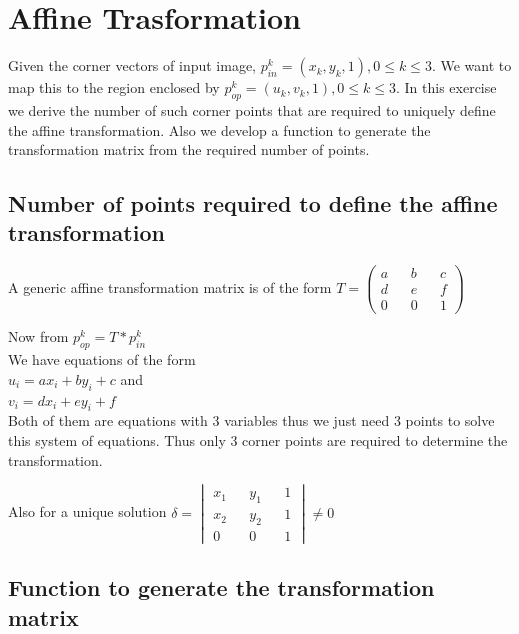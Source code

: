 \documentclass[paper=a4, fontsize=11pt]{scrartcl} %
\numberwithin{equation}{section} %
\numberwithin{figure}{section} %
\numberwithin{table}{section} %
\begin{document}

\section{Affine Trasformation}

Given the corner vectors of input image, \(p_{in}^k = (x_k,y_k,1), 0 \leq k \leq 3\). We want to map this to the region enclosed by \(p_{op}^k = (u_k,v_k,1), 0 \leq k \leq 3 \). In this exercise we derive the number of such corner points that are required to uniquely define the affine transformation. Also we develop a function to generate the transformation matrix from the required number of points.


\subsection{Number of points required to define the affine transformation}

A generic affine transformation matrix is of the form
\(
  T = 
  \begin{pmatrix}
    a && b && c\\
    d && e && f\\
    0 && 0 && 1
  \end{pmatrix}
\) 

Now from \(p_{op}^k = T*p_{in}^k\)\\
We have equations of the form \\
\(u_i = ax_i + by_i + c\) and\\
\(v_i = dx_i + ey_i + f\)\\
Both of them are equations with 3 variables thus we just need 3 points to solve this system of equations. Thus only 3 corner points are required to determine the transformation.

Also for a unique solution
\(
  \delta = 
  \begin{vmatrix}
    x_1 && y_1 && 1 \\
    x_2 && y_2 && 1 \\
    0 && 0 && 1
  \end{vmatrix} 
  \neq 0
\)



\subsection{Function to generate the transformation matrix}
\end{document}
